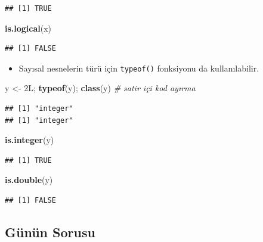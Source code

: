 \documentclass[
  oneside]{book}
\newenvironment{Shaded}{\begin{snugshade}}{\end{snugshade}}
\newcommand{\CommentTok}[1]{\textcolor[rgb]{0.56,0.35,0.01}{\textit{#1}}}
\newcommand{\FunctionTok}[1]{\textcolor[rgb]{0.13,0.29,0.53}{\textbf{#1}}}
\newcommand{\NormalTok}[1]{#1}
\newcommand{\OtherTok}[1]{\textcolor[rgb]{0.56,0.35,0.01}{#1}}
\providecommand{\tightlist}{%
  \setlength{\itemsep}{0pt}\setlength{\parskip}{0pt}}
\begin{document}
\begin{verbatim}
## [1] TRUE
\end{verbatim}

\begin{Shaded}
\begin{Highlighting}[]
\FunctionTok{is.logical}\NormalTok{(x)}
\end{Highlighting}
\end{Shaded}

\begin{verbatim}
## [1] FALSE
\end{verbatim}

\begin{itemize}
\tightlist
\item
  Sayısal nesnelerin türü için \texttt{typeof()} fonksiyonu da kullanılabilir.
\end{itemize}

\begin{Shaded}
\begin{Highlighting}[]
\NormalTok{y }\OtherTok{\textless{}{-}}\NormalTok{ 2L; }\FunctionTok{typeof}\NormalTok{(y); }\FunctionTok{class}\NormalTok{(y) }\CommentTok{\# satir içi kod ayırma}
\end{Highlighting}
\end{Shaded}

\begin{verbatim}
## [1] "integer"
## [1] "integer"
\end{verbatim}

\begin{Shaded}
\begin{Highlighting}[]
\FunctionTok{is.integer}\NormalTok{(y)}
\end{Highlighting}
\end{Shaded}

\begin{verbatim}
## [1] TRUE
\end{verbatim}

\begin{Shaded}
\begin{Highlighting}[]
\FunctionTok{is.double}\NormalTok{(y)}
\end{Highlighting}
\end{Shaded}

\begin{verbatim}
## [1] FALSE
\end{verbatim}

\hypertarget{guxfcnuxfcn-sorusu-1}{%
\subsection{Günün Sorusu}\label{guxfcnuxfcn-sorusu-1}}
\end{document}

